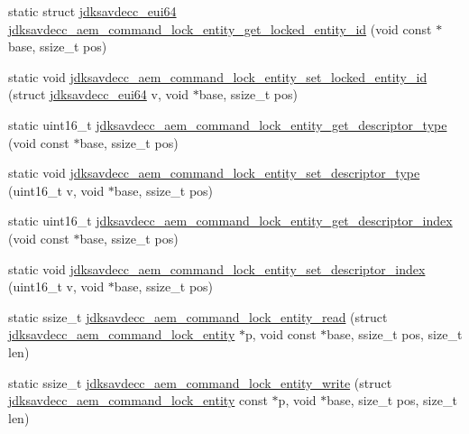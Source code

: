\begin{DoxyCompactItemize}
\item 
static struct \hyperlink{structjdksavdecc__eui64}{jdksavdecc\+\_\+eui64} \hyperlink{group__command__lock__entity_ga0410495cfb39b9abe9370039a59a630b}{jdksavdecc\+\_\+aem\+\_\+command\+\_\+lock\+\_\+entity\+\_\+get\+\_\+locked\+\_\+entity\+\_\+id} (void const $\ast$base, ssize\+\_\+t pos)
\item 
static void \hyperlink{group__command__lock__entity_ga20873c2654d4ee349d3b1e5ec53f172d}{jdksavdecc\+\_\+aem\+\_\+command\+\_\+lock\+\_\+entity\+\_\+set\+\_\+locked\+\_\+entity\+\_\+id} (struct \hyperlink{structjdksavdecc__eui64}{jdksavdecc\+\_\+eui64} v, void $\ast$base, ssize\+\_\+t pos)
\item 
static uint16\+\_\+t \hyperlink{group__command__lock__entity_ga4e90852d171513d0347947869b00d7c5}{jdksavdecc\+\_\+aem\+\_\+command\+\_\+lock\+\_\+entity\+\_\+get\+\_\+descriptor\+\_\+type} (void const $\ast$base, ssize\+\_\+t pos)
\item 
static void \hyperlink{group__command__lock__entity_ga403a35e4062fd1a0a55169292f5bffe3}{jdksavdecc\+\_\+aem\+\_\+command\+\_\+lock\+\_\+entity\+\_\+set\+\_\+descriptor\+\_\+type} (uint16\+\_\+t v, void $\ast$base, ssize\+\_\+t pos)
\item 
static uint16\+\_\+t \hyperlink{group__command__lock__entity_gabfe9a5d0582adea94a9b28e47c7e2358}{jdksavdecc\+\_\+aem\+\_\+command\+\_\+lock\+\_\+entity\+\_\+get\+\_\+descriptor\+\_\+index} (void const $\ast$base, ssize\+\_\+t pos)
\item 
static void \hyperlink{group__command__lock__entity_ga3d11dc57e27016ab5848e1cf5c389a8e}{jdksavdecc\+\_\+aem\+\_\+command\+\_\+lock\+\_\+entity\+\_\+set\+\_\+descriptor\+\_\+index} (uint16\+\_\+t v, void $\ast$base, ssize\+\_\+t pos)
\item 
static ssize\+\_\+t \hyperlink{group__command__lock__entity_ga00a36b7d42b2dd86df47dcd3afc3da3e}{jdksavdecc\+\_\+aem\+\_\+command\+\_\+lock\+\_\+entity\+\_\+read} (struct \hyperlink{structjdksavdecc__aem__command__lock__entity}{jdksavdecc\+\_\+aem\+\_\+command\+\_\+lock\+\_\+entity} $\ast$p, void const $\ast$base, ssize\+\_\+t pos, size\+\_\+t len)
\item 
static ssize\+\_\+t \hyperlink{group__command__lock__entity_ga72e701eb5960e2b447364aab20d03b51}{jdksavdecc\+\_\+aem\+\_\+command\+\_\+lock\+\_\+entity\+\_\+write} (struct \hyperlink{structjdksavdecc__aem__command__lock__entity}{jdksavdecc\+\_\+aem\+\_\+command\+\_\+lock\+\_\+entity} const $\ast$p, void $\ast$base, size\+\_\+t pos, size\+\_\+t len)
\end{DoxyCompactItemize}


